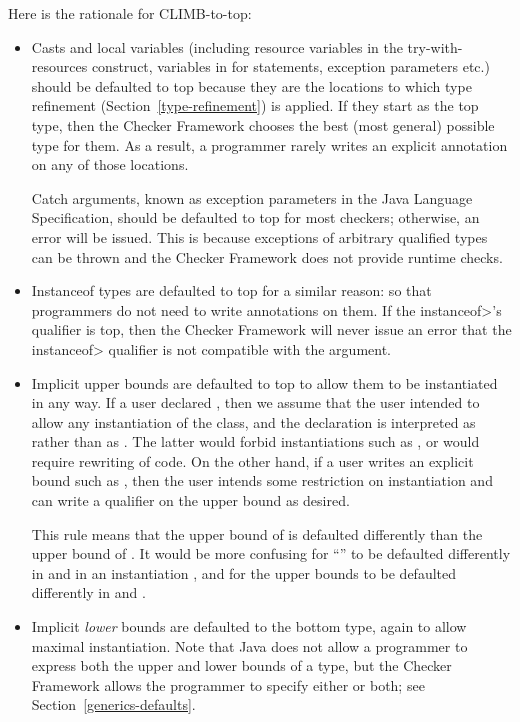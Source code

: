 Here is the rationale for CLIMB-to-top:

\begin{itemize}
\item
Casts and local variables (including resource variables in the
try-with-resources construct, variables in for statements, exception parameters etc.)
should be defaulted to top because they are the locations to
which type refinement (Section~\ref{type-refinement}) is applied.  If they
start as the top type, then the Checker Framework chooses the best (most
general) possible type for them.  As a result, a programmer rarely writes
an explicit annotation on any of those locations.

Catch arguments, known as exception parameters in the Java Language Specification,
should be defaulted to top for most checkers; otherwise, an error will be issued.  This is because
exceptions of arbitrary qualified types can be thrown and the Checker Framework
does not provide runtime checks.


\item
Instanceof types are defaulted to top for a similar reason:  so that
programmers do not need to write annotations on them.  If the
\<instanceof>'s qualifier is top, then the Checker Framework will never
issue an error that the \<instanceof> qualifier is not compatible with the
argument.

\item
Implicit upper bounds are defaulted to top to allow them to be instantiated
in any way.  If a user declared , then
we assume that the user intended to allow any instantiation of the class,
and the declaration is interpreted as  rather than as .  The latter would forbid
instantiations such as , or would require
rewriting of code.  On the other hand, if a user writes an explicit bound
such as , then the user
intends some restriction on instantiation and can write a qualifier on the
upper bound as desired.

This rule means that the upper bound of  is defaulted
differently than the upper bound of .  It
would be more confusing for ``'' to be defaulted differently in  and in an
instantiation , and for the upper bounds to be defaulted
differently in 
and .

\item
Implicit \emph{lower} bounds are defaulted to the bottom type, again to allow
maximal instantiation.  Note that Java does not allow a programmer to
express both the upper and lower bounds of a type, but the Checker
Framework allows the programmer to specify either or both;
see Section~\ref{generics-defaults}.

\end{itemize}

